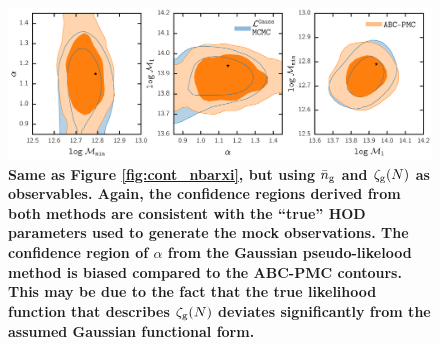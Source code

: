 \documentclass[fleqn,usenatbib]{mnras}
\begin{document}
\begin{figure}
\includegraphics[width=1.\textwidth]{figs/paper_ABCvsMCMC_contour_nbargmf.pdf}
\caption{\label{fig:cont_nbargmf} 
{\bf \color{dred}
Same as Figure \ref{fig:cont_nbarxi}, but using $\bar{n}_{\mathrm{g}}$ and $\mathcal{\zeta}_{\rm g}(N)$ as 
observables. Again, the confidence regions derived from both methods are 
consistent with the ``true'' HOD parameters used to generate the mock 
observations. The confidence region of $\alpha$ from the Gaussian 
pseudo-likelood method is biased compared to the ABC-PMC contours. 
This may be due to the fact that the true likelihood function that 
describes $\mathcal{\zeta}_{\rm g}(N)$ deviates significantly from the assumed Gaussian 
functional form.}
}
\end{figure}




\label{lastpage}
\end{document}

